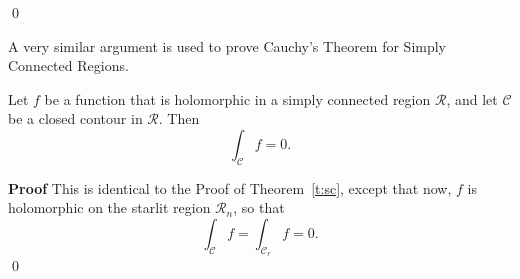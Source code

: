 \begin{comment}

While $\mathcal{R}_n$ is starlit, $\mathcal{R}_n \backslash \set{z_0}$ is not.  Thus we split $\mathcal{R}_n \backslash \set{z_0}$ into two starlit subregions, and construct contours $S_1$ and $S_2$ by connecting $\mathcal{C}^{(n)}$ and $\mathcal{C}_r$ as shown.
\begin{center}
\texttt{[image: ch5\_shrinking]}
\end{center}


By Cauchy's Theorem for Starlit Regions, we again have
\[
\int_{S_1} g = \int_{S_2} g = 0.
\]

Notice that if we join $S_1$ and $S_2$ we get a contour consisting of
\begin{itemize}
\item An anticlockwise copy of the circular contour $\mathcal{C}_r$, 
\item A clockwise copy of $\mathcal{C}^{(n)}$, i.e. the reverse of $\mathcal{C}^{(n)}$, and
\item two copies of each of the new edges connecting $\mathcal{C}^{(n)}$ and $\mathcal{C}_r$, one in each direction.
\end{itemize}
Thus we get
\[
\int_{S_1} g + \int_{S_2} g = \int_{\mathcal{C}_r} g - \int_{\mathcal{C}^{(n)}} g
\]
as the integrals along the new edges connecting $\mathcal{C}^{(n)}$ and $\mathcal{C}_r$ cancel, and we are left with $\mathcal{C}_r$ and the reverse of $\mathcal{C}^{(n)}$.
  
Hence
\[
0 = \int_{S_1} g + \int_{S_2} g = \int_{\mathcal{C}_r} g - \int_{\mathcal{C}^{(n)}} g
\]
and so
\[
\int_{\mathcal{C}_r} g = \int_{\mathcal{C}^{(n)}} g = \int_{\mathcal{C}} g.
\]
\blanksoff
\end{comment}

\qed

A very similar argument is used to prove Cauchy's Theorem for Simply Connected Regions.

\begin{theorem}
Let $f$ be a function that is holomorphic in a simply connected region $\mathcal{R}$, and let $\mathcal{C}$ be a closed contour in $\mathcal{R}$. Then
\[
\int_{\mathcal{C}} f = 0.
\]
\end{theorem}
{\bf Proof}
This is identical to the Proof of Theorem~\ref{t:sc}, except that now, $f$ is holomorphic on the starlit region $\mathcal{R}_n$, so that
\[
\int_{\mathcal{C}} f = \int_{\mathcal{C}_r} f =0.
\]
\qed


